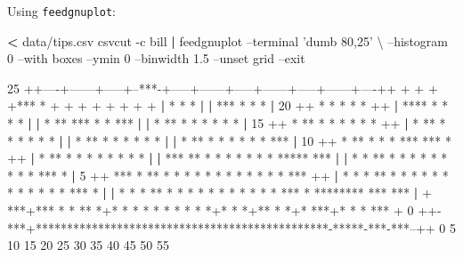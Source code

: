 \documentclass[
]{book}
\newenvironment{Shaded}{\begin{snugshade}}{\end{snugshade}}
\newcommand{\ExtensionTok}[1]{#1}
\newcommand{\KeywordTok}[1]{\textcolor[rgb]{0.13,0.29,0.53}{\textbf{#1}}}
\newcommand{\NormalTok}[1]{#1}
\newcommand{\OperatorTok}[1]{\textcolor[rgb]{0.81,0.36,0.00}{\textbf{#1}}}
\newcommand{\StringTok}[1]{\textcolor[rgb]{0.31,0.60,0.02}{#1}}
\theoremstyle{definition}
\theoremstyle{definition}
\theoremstyle{definition}
\theoremstyle{remark}
\begin{document}
Using \texttt{feedgnuplot}:

\begin{Shaded}
\begin{Highlighting}[]
\OperatorTok{<} \ExtensionTok{data/tips.csv}\NormalTok{ csvcut -c bill }\KeywordTok{|} \ExtensionTok{feedgnuplot}\NormalTok{ --terminal }\StringTok{'dumb 80,25'}\NormalTok{ \textbackslash{}}
\NormalTok{--histogram 0 --with boxes --ymin 0 --binwidth 1.5 --unset grid --exit}



  \ExtensionTok{25}\NormalTok{ ++----+------+-----+--***-+-----+------+-----+------+-----+------+----++}
     \ExtensionTok{+}\NormalTok{     +      +     +*** * +     +      +     +      +     +      +     +}
     \KeywordTok{|}                   \ExtensionTok{*}\NormalTok{ * *                                              }\KeywordTok{|}
     \KeywordTok{|}               \ExtensionTok{***}\NormalTok{ * * *                                              }\KeywordTok{|}
  \ExtensionTok{20}\NormalTok{ ++              * * * * *                                             ++}
     \KeywordTok{|}            \ExtensionTok{****}\NormalTok{ * * * *                                              }\KeywordTok{|}
     \KeywordTok{|}            \ExtensionTok{*}\NormalTok{ ** *** * * ***                                          }\KeywordTok{|}
     \KeywordTok{|}            \ExtensionTok{*}\NormalTok{ ** * * * * * *                                          }\KeywordTok{|}
  \ExtensionTok{15}\NormalTok{ ++           * ** * * * * * *                                         ++}
     \KeywordTok{|}            \ExtensionTok{*}\NormalTok{ ** * * * * * *                                          }\KeywordTok{|}
     \KeywordTok{|}            \ExtensionTok{*}\NormalTok{ ** * * * * * *                                          }\KeywordTok{|}
     \KeywordTok{|}            \ExtensionTok{*}\NormalTok{ ** * * * * * * ***                                      }\KeywordTok{|}
  \ExtensionTok{10}\NormalTok{ ++           * ** * * * *** *** *                                     ++}
     \KeywordTok{|}            \ExtensionTok{*}\NormalTok{ ** * * * * * * * *                                      }\KeywordTok{|}
     \KeywordTok{|}          \ExtensionTok{***}\NormalTok{ ** * * * * * * * ***** ***                              }\KeywordTok{|}
     \KeywordTok{|}          \ExtensionTok{*}\NormalTok{ * ** * * * * * * * * * *** *                              }\KeywordTok{|}
   \ExtensionTok{5}\NormalTok{ ++       *** * ** * * * * * * * * * * * *   ***                       ++}
     \KeywordTok{|}        \ExtensionTok{*}\NormalTok{ * * ** * * * * * * * * * * * * *** *                        }\KeywordTok{|}
     \KeywordTok{|}        \ExtensionTok{*}\NormalTok{ * * ** * * * * * * * * * * * *** * ********   *** ***       }\KeywordTok{|}
     \ExtensionTok{+}\NormalTok{  ***+*** * * ** *+* * * * * * * * * *+* * *+** * *+* ***+* * * ***   +}
   \ExtensionTok{0}\NormalTok{ ++-***+***********************************************-*****-***-***--++}
     \ExtensionTok{0}\NormalTok{     5      10    15     20    25     30    35     40    45     50    55}
\end{Highlighting}
\end{Shaded}
\end{document}
